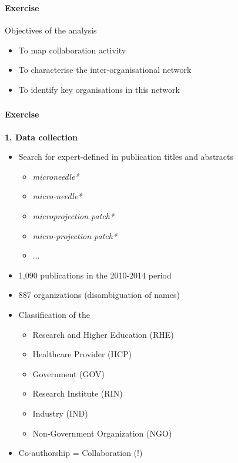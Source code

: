 \documentclass[8pt]{beamer}
\begin{document}

\begin{frame}
\frametitle{\insertsection}
\framesubtitle{Exercise}

Objectives of the analysis
\begin{itemize}
	\item To map collaboration activity
	\item To characterise the inter-organisational network
	\item To identify key organisations in this network
\end{itemize}

\end{frame}


\begin{frame}
\frametitle{\insertsection}
\framesubtitle{Exercise}
   
\textbf{1. Data collection}
    \begin{itemize}          
     \item Search for expert-defined {\color{teal}{keywords}} in publication titles and abstracts
         \begin{itemize}  
         \item \textit{microneedle*} 
         \item \textit{micro-needle*} 
         \item \textit{microprojection patch*} 
         \item \textit{micro-projection patch*}
         \item ...
         \end{itemize}
         		                      
    \item 1,090 publications in the 2010-2014 period
     
    \item 887 organizations (disambiguation of names) 
                   
     \item Classification of the {\color{teal}{organisations by type}}
       		\begin{itemize}
       		\item Research and Higher Education (RHE)
       		\item Healthcare Provider (HCP)
        	\item Government (GOV)
            \item Research Institute (RIN)
            \item Industry (IND)
            \item Non-Government Organization (NGO)
			\end{itemize}
				   
      \item {\color{red}{Assumption:}} Co-authorship = Collaboration (!)
                             
        \end{itemize}

\end{frame}
\end{document}
